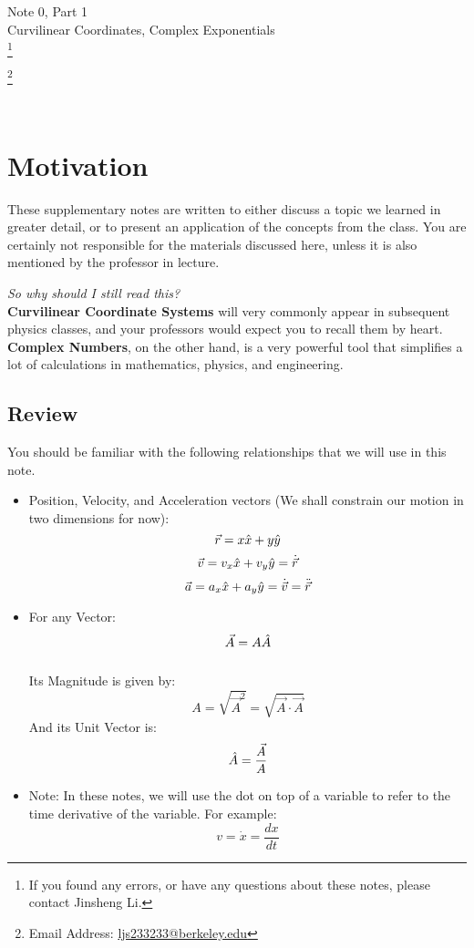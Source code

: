 \documentclass[11pt]{article}
\newcommand\blfootnote[1]{
    \begingroup
    \renewcommand\thefootnote{}\footnote{#1}
    \addtocounter{footnote}{-1}
    \endgroup
}
\theoremstyle{gangnamstyle}{\newtheorem{definition}{Definition}[]}
\theoremstyle{gangnamstyle}{\newtheorem{example}{Example}[]}
\theoremstyle{gangnamstyle}{\newtheorem{problem}{Problem}[]}
\begin{document}
\normalfont
\pagestyle{pages}


\begin{center}
\vspace{3in}
{\Large Note 0, Part 1 } \\[0.05in]
Curvilinear Coordinates, Complex Exponentials  \\ 
\blfootnote{If you found any errors, or have any questions about these notes, please contact Jinsheng Li.} \blfootnote{Email Address: \href{mailto:ljs233233@berkeley.edu}{ljs233233@berkeley.edu}} \\ [-0.5in]
\end{center}

\section*{Motivation}

These supplementary notes are written to either discuss a topic we learned in greater detail, or to present an application of the concepts from the class. You are certainly not responsible for the materials discussed here, unless it is also mentioned by the professor in lecture. 

\textit{So why should I still read this?} \\
\textbf{Curvilinear Coordinate Systems} will very commonly appear in subsequent physics classes, and your professors would expect you to recall them by heart. \textbf{Complex Numbers}, on the other hand, is a very powerful tool that simplifies a lot of calculations in mathematics, physics, and engineering. 

\subsection*{Review}

You should be familiar with the following relationships that we will use in this note. 

\begin{itemize}
\item Position, Velocity, and Acceleration vectors (We shall constrain our motion in two dimensions for now): 
\[ \Vec{r} = x\Hat{x} + y\Hat{y} \]
\[ \Vec{v} = v_x\Hat{x} + v_y\Hat{y} = \Dot{\Vec{r}} \]
\[ \Vec{a} = a_x\Hat{x} + a_y\Hat{y} = \Dot{\Vec{v}} = \Ddot{\Vec{r}} \]
\item For any Vector: 
\[ \Vec{A} = A\Hat{A} \] \\
Its Magnitude is given by: 
\[ A = \sqrt{\Vec{A}^2} = \sqrt{\Vec{A} \cdot \Vec{A}} \]
And its Unit Vector is: 
\[ \Hat{A} = \frac{\Vec{A}}{A} \]
\item Note: In these notes, we will use the dot on top of a variable to refer to the time derivative of the variable. For example: 
\[ v = \Dot{x} = \frac{dx}{dt} \]
\end{itemize}
\pagebreak
\end{document}
